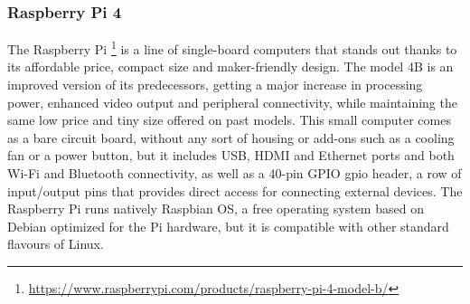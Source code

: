 \subsubsection{Raspberry Pi 4}
\label{subsec:rpi}
The Raspberry Pi \footnote{\url{https://www.raspberrypi.com/products/raspberry-pi-4-model-b/}} is a line of single-board computers that stands out thanks to its affordable price,
compact size and maker-friendly design. The model 4B is an improved version of its predecessors,
getting a major increase in processing power, enhanced video output and peripheral connectivity,
while maintaining the same low price and tiny size offered on past models.
This small computer comes as a bare circuit board,
without any sort of housing or add-ons such as a cooling fan or a power button,
but it includes USB, HDMI and Ethernet ports and both Wi-Fi and Bluetooth connectivity,
as well as a 40-pin GPIO \gls{gpio} header, a row of input/output pins that provides direct access for connecting external devices.
The Raspberry Pi runs natively Raspbian OS, a free operating system based on Debian optimized for the Pi hardware, but it is compatible with other standard flavours of Linux.
